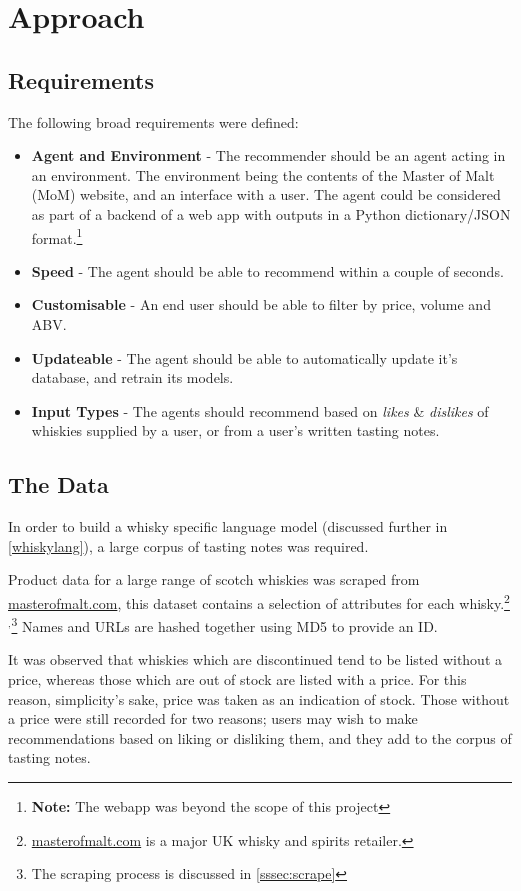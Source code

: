 \section{Approach}\label{sec:approach}
\subsection{Requirements}
The following broad requirements were defined:
\begin{itemize}
    \item \textbf{Agent and Environment} - The recommender should be an agent acting in an environment. 
    The environment being the contents of the Master of Malt (MoM) website, and an interface with a user.
    The agent could be considered as part of a backend of a web app with outputs in a Python dictionary/JSON
    format.\footnote{\textbf{Note:} The webapp was beyond the scope of this project}
    \item \textbf{Speed} - The agent should be able to recommend
    within a couple of seconds.
    \item \textbf{Customisable} - An end user should be able to filter by price,
    volume and ABV.
    \item \textbf{Updateable} - The agent should be able to automatically update
    it's database, and retrain its models.
    \item \textbf{Input Types} - The agents should recommend based on \emph{likes} 
    \& \emph{dislikes} of whiskies supplied by a user, or from a user's written 
    tasting notes.
\end{itemize}

\subsection{The Data}
In order to build a whisky specific language model (discussed further in
\autoref{whiskylang}), a large corpus of tasting notes was required.

Product data for a large range of scotch whiskies was scraped from
\href{http://masterofmalt.com/}{masterofmalt.com}, this dataset contains a selection of attributes for each 
whisky.\footnote{\href{http://masterofmalt.com/}{masterofmalt.com} is a major UK whisky and spirits retailer.}$^{,}$\footnote{The scraping process is discussed in \autoref{sssec:scrape}}
Names and URLs are hashed together using MD5 to provide an ID.

It was observed that whiskies which are discontinued tend to be listed
without a price, whereas those which are out of stock are listed with a
price.  For this reason, simplicity's sake, price was taken as an
indication of stock.  Those without a price
were still recorded for two reasons; users may wish to make recommendations
based on liking or disliking them, and they add to the corpus of tasting notes.

